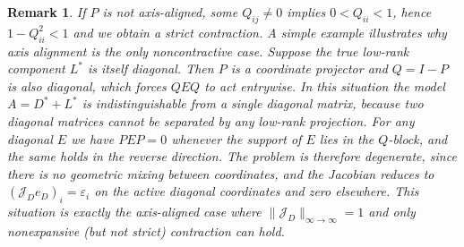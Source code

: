\documentclass[final,hidelinks,onefignum,onetabnum]{siamart250211}
\providecommand{\1}{\mathbf{1}}
\newtheorem{rmk}{Remark}[section]
\theoremstyle{plain}
\begin{document}
\begin{rmk}
    If $P$ is not axis-aligned, some $Q_{ij}\neq 0$ implies $0<Q_{ii}<1$, hence
    $1-Q_{ii}^2<1$ and we obtain a strict contraction.  A simple example illustrates why axis
    alignment is the only noncontractive case.  Suppose the true low-rank component $L^*$ is itself
    diagonal.  Then $P$ is a coordinate projector and $Q=I-P$ is also diagonal, which forces $QEQ$ to
    act entrywise.  In this situation the model $A=D^*+L^*$ is indistinguishable from a single diagonal
    matrix, because two diagonal matrices cannot be separated by any low-rank projection.  For any
    diagonal $E$ we have $PEP=0$ whenever the support of $E$ lies in the $Q$-block, and the same holds
    in the reverse direction.  The problem is therefore degenerate, since there is no geometric mixing
    between coordinates, and the Jacobian reduces to $(\mathcal{J}_D e_D)_i=\varepsilon_i$ on the
    active diagonal coordinates and zero elsewhere.  This situation is exactly the axis-aligned case
    where $\|\mathcal{J}_D\|_{\infty\to\infty}=1$ and only nonexpansive (but not strict) contraction
    can hold.
\end{rmk}









\end{document}
